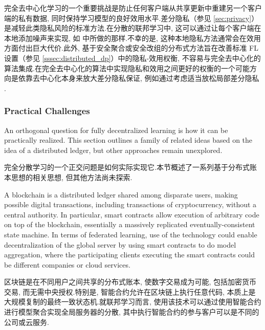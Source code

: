 完全去中心化学习的一个重要挑战是防止任何客户端从共享更新中重建另一个客户端的私有数据, 同时保持学习模型的良好效用水平.差分隐私（参见 \cref{sec:privacy}）是减轻此类隐私风险的标准方法.在分散的联邦学习中, 这可以通过让每个客户端在本地添加噪声来实现, 如 \citep{Huang2015a,Bellet2018a} 中所做的那样.不幸的是, 这种本地隐私方法通常会在效用方面付出巨大代价.此外, 基于安全聚合或安全改组的分布式方法旨在改善标准 FL 设置（参见 \cref{sssec:distributed_dp}）中的隐私-效用权衡, 不容易与完全去中心化的算法集成.在完全去中心化的算法中实现隐私和效用之间更好的权衡的一个可能方向是依靠去中心化本身来放大差分隐私保证, 例如通过考虑适当放松局部差分隐私 \cite{privacy_amp_by_decentralization}.
\subsubsection{Practical Challenges}
\label{sec:p2p-practical}

An orthogonal question for fully decentralized learning is how it can be practically realized. This section outlines a family of related ideas based on the idea of a distributed ledger, but other approaches remain unexplored.

完全分散学习的一个正交问题是如何实际实现它.本节概述了一系列基于分布式账本思想的相关思想, 但其他方法尚未探索.

A blockchain is a distributed ledger shared among disparate users, making possible digital transactions, including transactions of cryptocurrency, without a central authority. In particular, smart contracts allow execution of arbitrary code on top of the blockchain, essentially a massively replicated eventually-consistent state machine. In terms of federated learning, use of the technology could enable decentralization of the global server by using smart contracts to do model aggregation, where the participating clients executing the smart contracts could be different companies or cloud services.

区块链是在不同用户之间共享的分布式账本, 使数字交易成为可能, 包括加密货币交易, 而无需中央授权.特别是, 智能合约允许在区块链上执行任意代码, 本质上是大规模复制的最终一致状态机.就联邦学习而言, 使用该技术可以通过使用智能合约进行模型聚合实现全局服务器的分散, 其中执行智能合约的参与客户可以是不同的公司或云服务.

